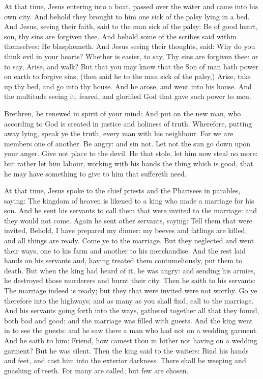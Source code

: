 At that time, Jesus entering into a boat, passed over the water and came into
his own city.
And behold they brought to him one sick of the palsy lying in a
bed. And Jesus, seeing their faith, said to the man sick of the palsy:
Be of good heart, son, thy sins are forgiven thee.
And behold some of the scribes said within themselves: He
blasphemeth.
And Jesus seeing their thoughts, said: Why do you think evil in
your hearts?
Whether is easier, to say, Thy sins are forgiven thee: or to say,
Arise, and walk?
But that you may know that the Son of man hath power on earth to
forgive sins, (then said he to the man sick of the palsy,) Arise, take
up thy bed, and go into thy house.
And he arose, and went into his house.
And the multitude seeing it, feared, and glorified God that gave
such power to men.





Brethren, be renewed in spirit of your mind:
And put on the new man, who according to God is created in justice
and holiness of truth.
Wherefore, putting away lying, speak ye the truth, every man with
his neighbour. For we are members one of another.
Be angry: and sin not. Let not the sun go down upon your anger.
Give not place to the devil.
He that stole, let him now steal no more: but rather let him
labour, working with his hands the thing which is good, that he may have
something to give to him that suffereth need.



At that time, Jesus spoke to the chief priests and the Pharisees in parables, saying:
The kingdom of heaven is likened to a king who made a marriage for
his son.
And he sent his servants to call them that were invited to the
marriage: and they would not come.
Again he sent other servants, saying: Tell them that were invited,
Behold, I have prepared my dinner: my beeves and fatlings are killed,
and all things are ready. Come ye to the marriage.
But they neglected and went their ways, one to his farm and
another to his merchandise.
And the rest laid hands on his servants and, having treated them
contumeliously, put them to death.
But when the king had heard of it, he was angry: and sending his
armies, he destroyed those murderers and burnt their city.
Then he saith to his servants: The marriage indeed is ready; but
they that were invited were not worthy.
Go ye therefore into the highways; and as many as you shall find,
call to the marriage.
And his servants going forth into the ways, gathered together all
that they found, both bad and good: and the marriage was filled with
guests.
And the king went in to see the guests: and he saw there a man
who had not on a wedding garment.
And he saith to him: Friend, how camest thou in hither not having
on a wedding garment? But he was silent.
Then the king said to the waiters: Bind his hands and feet, and
cast him into the exterior darkness. There shall be weeping and gnashing
of teeth.
For many are called, but few are chosen.


